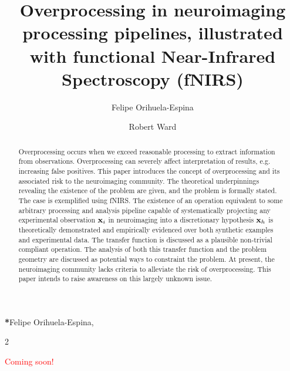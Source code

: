 \documentclass[12pt]{spieman}  %
\title{Overprocessing in neuroimaging processing pipelines, illustrated with functional Near-Infrared Spectroscopy (fNIRS)}
\author[a]{Felipe Orihuela-Espina}
\author[a]{Robert Ward}
\affil[a]{University of Birmingham, School of Computer Science, Edgbaston, Birmingham, United Kingdom}
\begin{document}
 
\maketitle

\begin{abstract}
 Overprocessing occurs when we exceed reasonable processing to extract information from observations. Overprocessing can severely affect interpretation of results, e.g. increasing false positives. This paper introduces the concept of overprocessing and its associated risk to the neuroimaging community.
 The theoretical underpinnings revealing the existence of the problem are given, and the problem is formally stated. The case is exemplified using fNIRS. 
 The existence of an operation equivalent to some arbitrary processing and analysis pipeline capable of systematically projecting any experimental observation $\color{equationscolor}\mathbf{x}_i$ in neuroimaging into a discretionary hypothesis $\color{equationscolor}\mathbf{x}_h$ is theoretically demonstrated and empirically evidenced over both synthetic examples and experimental data.
The transfer function is discussed as a plausible non-trivial compliant operation.
 The analysis of both this transfer function and the problem geometry are discussed as potential ways to constraint the problem.
At present, the neuroimaging community lacks criteria to alleviate the risk of overprocessing. This paper intends to raise awareness on this largely unknown issue. 
\end{abstract}


{\noindent \footnotesize\textbf{*}Felipe Orihuela-Espina,   }

\begin{spacing}{2}   %

\begin{center}
\huge \textcolor{red}{Coming soon!}
\end{center}


\end{spacing}
\end{document}
